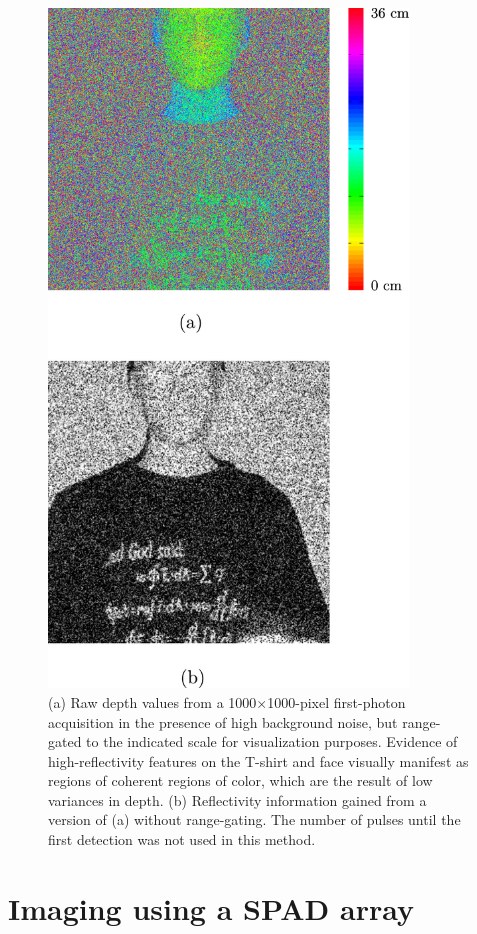 \begin{figure}[htb]
\centerline{\includegraphics[height=18cm]{figure-first-intensityfromdepth.pdf}}
\caption{(a) Raw depth values from a 1000$\times$1000-pixel first-photon acquisition in the presence of high background noise, but range-gated to the indicated scale for visualization purposes. Evidence of high-reflectivity features on the T-shirt and face visually manifest as regions of coherent regions of color, which are the result of low variances in depth. (b) Reflectivity information gained from a version of (a) without range-gating. The number of pulses until the first detection was not used in this method.}
\label{figure:first-intensityfromdepth}
\end{figure}

\section{Imaging using a SPAD array}

